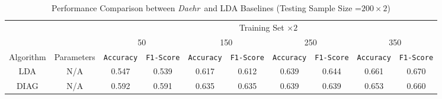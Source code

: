 \documentclass[journal,compsoc]{IEEEtran}
\newcommand{\TheName}{\mbox{\emph{Daehr}}}
\begin{document}
\begin{table}
{
\begin{center}
\caption{Performance Comparison between \TheName\ and LDA Baselines (Testing Sample Size =$200\times 2$)}
		\label{tab:table11}
\begin{tabular}{*{10}{c}}
\toprule
    & & \multicolumn{8}{c}{Training Set $\times 2$}\\
    \cmidrule(lr){3-10}
    & & 
    \multicolumn{2}{c}{50} &
    \multicolumn{2}{c}{150} &
    \multicolumn{2}{c}{250} &
    \multicolumn{2}{c}{350} \\
\cmidrule(lr){3-4}
\cmidrule(lr){5-6}
\cmidrule(lr){7-8}
\cmidrule(lr){9-10}
Algorithm & Parameters & \texttt{Accuracy} & \texttt{F1-Score} & 
									   	 \texttt{Accuracy} & \texttt{F1-Score} & 
                          			 \texttt{Accuracy} & \texttt{F1-Score} & 
                           			 \texttt{Accuracy} & \texttt{F1-Score} \\
 \cmidrule(lr){1-2}                        
\cmidrule(lr){3-4}
\cmidrule(lr){5-6}
\cmidrule(lr){7-8}
\cmidrule(lr){9-10}
    LDA & N/A &   0.547 & 0.539   &     0.617 & 0.612       & 0.639 & 0.644      & 0.661 & 0.670 \\

\cmidrule(lr){1-2}                        
\cmidrule(lr){3-4}
\cmidrule(lr){5-6}
\cmidrule(lr){7-8}
\cmidrule(lr){9-10}
    DIAG & N/A &   0.592 & 0.591 &      0.635 & 0.635 &      0.639 & 0.639&   0.653 & 0.660    \\
    \cmidrule(lr){1-2}                        
\cmidrule(lr){3-4}
\cmidrule(lr){5-6}
\cmidrule(lr){7-8}
\cmidrule(lr){9-10}


\end{tabular}
\end{center}}
\end{table}
\end{document}
